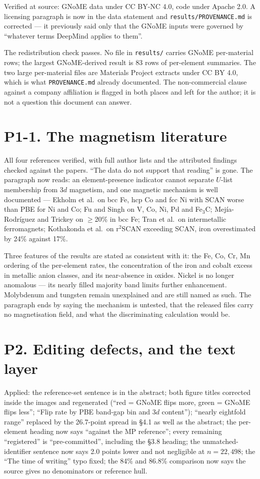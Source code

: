 \documentclass[11pt]{article}
\begin{document}
Verified at source: GNoME data under CC BY-NC 4.0, code under Apache 2.0. A licensing
paragraph is now in the data statement and \texttt{results/PROVENANCE.md} is corrected ---
it previously said only that the GNoME inputs were governed by ``whatever terms DeepMind
applies to them''.

The redistribution check passes. No file in \texttt{results/} carries GNoME per-material
rows; the largest GNoME-derived result is 83 rows of per-element summaries. The two large
per-material files are Materials Project extracts under CC BY 4.0, which is what
\texttt{PROVENANCE.md} already documented. The non-commercial clause against a company
affiliation is flagged in both places and left for the author; it is not a question this
document can answer.

\section*{P1-1. The magnetism literature}

All four references verified, with full author lists and the attributed findings checked
against the papers. ``The data do not support that reading'' is gone. The paragraph now
reads: an element-presence indicator cannot separate $U$-list membership from 3$d$
magnetism, and one magnetic mechanism is well documented --- Ekholm et al.\ on bcc Fe, hcp
Co and fcc Ni with SCAN worse than PBE for Ni and Co; Fu and Singh on V, Co, Ni, Pd and
Fe$_3$C; Mej\'ia-Rodr\'iguez and Trickey on $\ge$20\% in bcc Fe; Tran et al.\ on
intermetallic ferromagnets; Kothakonda et al.\ on r$^2$SCAN exceeding SCAN, iron
overestimated by 24\% against 17\%.

Three features of the results are stated as consistent with it: the Fe, Co, Cr, Mn ordering
of the per-element rates, the concentration of the iron and cobalt excess in metallic anion
classes, and its near-absence in oxides. Nickel is no longer anomalous --- its nearly filled
majority band limits further enhancement. Molybdenum and tungsten remain unexplained and
are still named as such. The paragraph ends by saying the mechanism is untested, that the
released files carry no magnetisation field, and what the discriminating calculation would
be.

\section*{P2. Editing defects, and the text layer}

Applied: the reference-set sentence is in the abstract; both figure titles corrected inside
the images and regenerated (``red = GNoME flips more, green = GNoME flips less'';
``Flip rate by PBE band-gap bin and 3$d$ content''); ``nearly eightfold range'' replaced by
the 26.7-point spread in \S4.1 as well as the abstract; the per-element heading now says
``against the MP reference''; every remaining ``registered'' is ``pre-committed'', including
the \S3.8 heading; the unmatched-identifier sentence now says 2.0 points lower and not
negligible at $n=22{,}498$; the ``The time of writing'' typo fixed; the 84\% and 86.8\%
comparison now says the source gives no denominators or reference hull.
\end{document}
